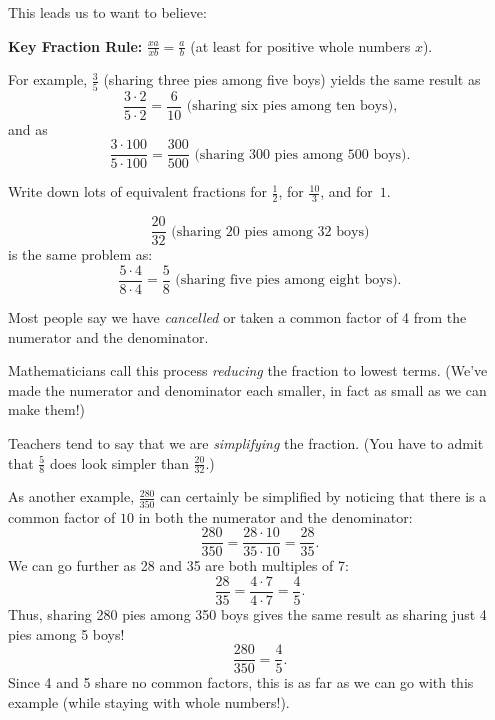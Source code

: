 This leads us to want to believe:


{\bf Key Fraction Rule:} $\displaystyle \frac{xa}{xb} = \frac{a}{b}$ (at least for positive whole numbers $x$).


\begin{example}
 For example,
 $\frac 3 5$
(sharing three pies among five boys)
yields the same result as
 \[
 \frac{3 \cdot 2}{5 \cdot 2} = \frac{6}{10}
\text{ (sharing six pies among ten boys),}
 \]
and as
 \[
 \frac{3 \cdot 100}{5 \cdot 100} = \frac{300}{500}
\text{ (sharing 300 pies among 500 boys).}
 \]
 \end{example}
 
 
 \begin{thinkpair*}
Write down lots of equivalent fractions for $\frac 1 2$,  for $\frac {10}3$, and for~$1$.  
 \end{thinkpair*}
 
  
\begin{example}
 \[
 \frac{20}{32}
\text{ (sharing 20 pies among 32 boys)}
 \]
is the same problem as:
 \[
\frac{5 \cdot 4 }{8\cdot 4} = \frac 5 8
\text{ (sharing five pies among eight boys).}
 \]
 \end{example}
 
 
Most people say we have \emph{cancelled} or taken a common factor of 4 from
the numerator and the denominator.
 
Mathematicians call this process \emph{reducing} the fraction to lowest terms. (We've
made the numerator and denominator each smaller, in fact as small as we can make them!) 
 
 Teachers tend to say that we
are \emph{simplifying} the fraction. (You have to admit that $\frac 5 8$
does look simpler than
$\frac{20}{32}$.)
 
 
 \begin{example}
 As another example,
 $\frac{280}
{350}$
can certainly be simplified by noticing that there is a
common factor of $10$ in both the numerator and the denominator:
 \[
 \frac{280}{350} = \frac{28\cdot 10}{35\cdot 10} = \frac{28}{35}.
 \]
We can go further as 28 and 35 are both multiples of 7:
 \[
 \frac{28}{35} = \frac{4 \cdot 7}{4 \cdot 7} = \frac 4 5.
 \]
Thus, sharing 280 pies among 350 boys gives the same result as sharing just 4 pies
among 5 boys!
\[
 \frac{280}{350} = \frac 4 5.
 \]
Since 4 and 5 share no common factors, this is as far as we can go with this example
(while staying with whole numbers!).
 \end{example}
 

